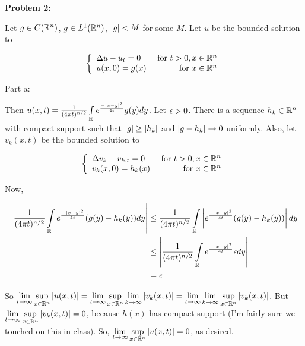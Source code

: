 \documentclass[a4paper,12pt]{article}
\begin{document}
{\bf Problem 2:}

Let $g \in C(\mathbb{R}^n)$, $g \in L^1(\mathbb{R}^n)$, $\left\lvert g \right\rvert < M$ for some $M$. Let $u$ be the bounded solution to 

\begin{displaymath}
   \left\{
     \begin{array}{lr}
       \Delta u -u_t  = 0 & \text{ for } t>0, x \in \mathbb{R}^n \\
       u(x,0) = g(x) & \text{ for } x \in \mathbb{R}^n
     \end{array}
   \right.
\end{displaymath}

Part a:

Then $u(x,t) = \frac{1}{(4\pi t)^{n/2}}\int\limits_{\mathbb{R}} e^{\frac{-\left\lvert x-y \right\rvert^2}{4t}} g(y) dy$. Let $\epsilon >0$. There is a sequence $h_k \in \mathbb{R}^n$ with compact support such that $\left\lvert g \right\rvert\geq \left\lvert h_k \right\rvert$ and $\left\lvert g-h_k \right\rvert \to 0$ uniformly. Also, let $v_k(x,t)$ be the bounded solution to

\begin{displaymath}
   \left\{
     \begin{array}{lr}
       \Delta v_k -v_{k,t}  = 0 & \text{ for } t>0, x \in \mathbb{R}^n \\
       v_k(x,0) = h_k(x) & \text{ for } x \in \mathbb{R}^n
     \end{array}
   \right.
\end{displaymath}


Now,  %

\begin{align*}
\left\lvert \frac{1}{(4\pi t)^{n/2}}\int\limits_{\mathbb{R}} e^{\frac{-\left\lvert x-y \right\rvert^2}{4t}} (g(y) -h_k(y)) dy \right\rvert &\leq \frac{1}{(4\pi t)^{n/2}}\int\limits_{\mathbb{R}} \left\lvert e^{\frac{-\left\lvert x-y \right\rvert^2}{4t}} (g(y) -h_k(y)) \right\rvert dy\\
&\leq \left\lvert  \frac{1}{(4\pi t)^{n/2}}\int\limits_{\mathbb{R}} e^{\frac{-\left\lvert x-y \right\rvert^2}{4t}} \epsilon dy \right\rvert\\
&= \epsilon
\end{align*}

So $\lim\limits_{t \to \infty} \sup\limits_{x \in \mathbb{R}^n} \left\lvert u(x,t) \right\rvert = \lim\limits_{t \to \infty} \sup\limits_{x \in \mathbb{R}^n} \lim\limits_{k \to \infty} \left\lvert v_k(x,t) \right\rvert = \lim\limits_{t \to \infty} \lim\limits_{k \to \infty} \sup\limits_{x \in \mathbb{R}^n} \left\lvert v_k(x,t) \right\rvert$. But $\lim\limits_{t \to \infty} \sup\limits_{x \in \mathbb{R}^n} \left\lvert v_k(x,t) \right\rvert = 0$, because $h(x)$ has compact support (I'm fairly sure we touched on this in class). So, $\lim\limits_{t \to \infty} \sup\limits_{x \in \mathbb{R}^n} \left\lvert u(x,t) \right\rvert = 0$, as desired.
\end{document}
